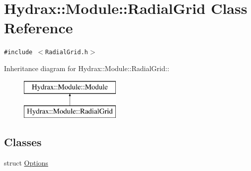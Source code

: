 \hypertarget{class_hydrax_1_1_module_1_1_radial_grid}{
\section{Hydrax::Module::RadialGrid Class Reference}
\label{class_hydrax_1_1_module_1_1_radial_grid}
}
{\tt \#include $<$RadialGrid.h$>$}

Inheritance diagram for Hydrax::Module::RadialGrid::\begin{figure}[H]
\begin{center}
\leavevmode
\includegraphics[height=2cm]{class_hydrax_1_1_module_1_1_radial_grid}
\end{center}
\end{figure}
\subsection*{Classes}
\begin{CompactItemize}
\item 
struct \hyperlink{struct_hydrax_1_1_module_1_1_radial_grid_1_1_options}{Options}
\end{CompactItemize}
